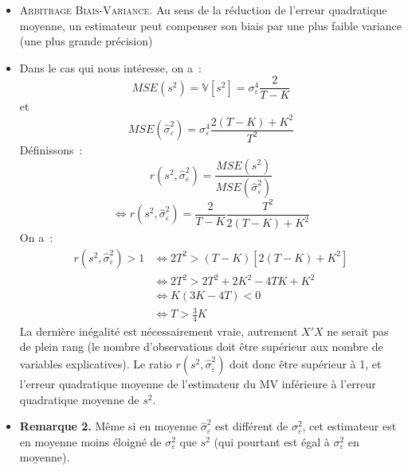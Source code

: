 \documentclass[10pt]{beamer}
\theoremstyle{plain}
\begin{document}
\begin{notes}
\begin{itemize}
  \item \textsc{Arbitrage Biais-Variance.} Au sens de la réduction de l'erreur quadratique moyenne, un estimateur peut compenser son biais par une plus faible variance (une plus grande précision)\newline

  \item Dans le cas qui nous intéresse, on a~:
    \[
      MSE(s^2) = \mathbb V\left[ s^2 \right] = \sigma_{\varepsilon}^4\frac{2}{T-K}
    \]
    et
    \[
      MSE(\hat{\sigma}_{\varepsilon}^2) = \sigma_{\varepsilon}^4 \frac{2(T-K)+K^2}{T^2}
    \]
    Définissons~:
    \[
      r(s^2, \hat{\sigma}_{\varepsilon}^2) = \frac{MSE(s^2)}{MSE(\hat{\sigma}_{\varepsilon}^2)}
    \]
    \[
      \Leftrightarrow r(s^2, \hat{\sigma}_{\varepsilon}^2) = \frac{2}{T-K}\frac{T^2}{2(T-K)+K^2}
    \]
    On a~:
    \[
      \begin{split}
        r(s^2, \hat{\sigma}_{\varepsilon}^2) >1 &\Leftrightarrow 2T^2 > (T-K)\left[ 2(T-K) + K^2 \right]\\
                                                &\Leftrightarrow 2T^2 > 2T^2 + 2K^2 -4TK + K^2\\
                                                &\Leftrightarrow K(3K-4T)<0\\
                                                &\Leftrightarrow T>\frac{3}{4}K
      \end{split}
    \]
    La dernière inégalité est nécessairement vraie, autrement $X'X$ ne serait pas de plein rang (le nombre d'observations doit être supérieur aux nombre de variables explicatives). Le ratio $r(s^2, \hat{\sigma}_{\varepsilon}^2)$ doit donc être supérieur à 1, et l'erreur quadratique moyenne de l'estimateur du MV inférieure à l'erreur quadratique moyenne de $s^2$.\newline

  \item \textbf{Remarque 2.} Même si en moyenne $\hat{\sigma}_{\varepsilon}^2$ est différent de $\sigma_{\varepsilon}^2$, cet estimateur est en moyenne moins éloigné de  $\sigma_{\varepsilon}^2$ que $s^2$ (qui pourtant est égal à  $\sigma_{\varepsilon}^2$ en moyenne).

  \end{itemize}

\end{notes}
\end{document}
